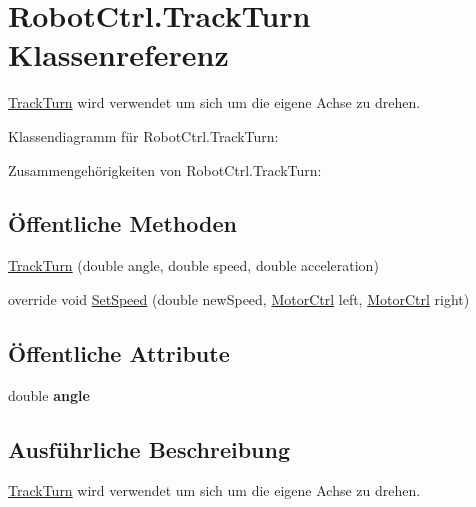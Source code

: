 \hypertarget{class_robot_ctrl_1_1_track_turn}{
\section{RobotCtrl.TrackTurn Klassenreferenz}
\label{class_robot_ctrl_1_1_track_turn}
}


\hyperlink{class_robot_ctrl_1_1_track_turn}{TrackTurn} wird verwendet um sich um die eigene Achse zu drehen.  




Klassendiagramm für RobotCtrl.TrackTurn:

Zusammengehörigkeiten von RobotCtrl.TrackTurn:\subsection*{Öffentliche Methoden}
\begin{DoxyCompactItemize}
\item 
\hyperlink{class_robot_ctrl_1_1_track_turn_a734b50f5f72a3521d15855b0f86d2c6c}{TrackTurn} (double angle, double speed, double acceleration)
\item 
override void \hyperlink{class_robot_ctrl_1_1_track_turn_a065e23cd313e746cb65496c9b9df0955}{SetSpeed} (double newSpeed, \hyperlink{class_robot_ctrl_1_1_motor_ctrl}{MotorCtrl} left, \hyperlink{class_robot_ctrl_1_1_motor_ctrl}{MotorCtrl} right)
\end{DoxyCompactItemize}
\subsection*{Öffentliche Attribute}
\begin{DoxyCompactItemize}
\item 
\hypertarget{class_robot_ctrl_1_1_track_turn_a5ea004969a5701516952d1424dfa2be3}{
double {\bfseries angle}}
\label{class_robot_ctrl_1_1_track_turn_a5ea004969a5701516952d1424dfa2be3}

\end{DoxyCompactItemize}


\subsection{Ausführliche Beschreibung}
\hyperlink{class_robot_ctrl_1_1_track_turn}{TrackTurn} wird verwendet um sich um die eigene Achse zu drehen. 

